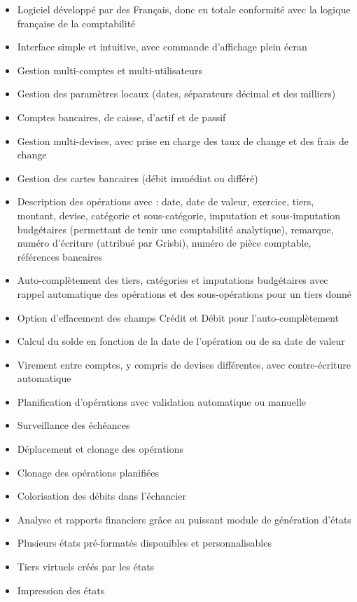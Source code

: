 \begin{itemize}
	\item Logiciel développé par des Français, donc en totale conformité avec la logique française de la comptabilité
	\item Interface simple et intuitive, avec commande d'affichage plein écran
	\item Gestion multi-comptes et multi-utilisateurs
	\item Gestion des paramètres locaux (dates, séparateurs décimal et des milliers)	
	\item Comptes bancaires, de caisse, d'actif et de passif
	\item Gestion multi-devises, avec prise en charge des taux de change et des frais de change
	\item Gestion des cartes bancaires (débit immédiat ou différé)	
	\item Description des opérations avec : date, date de valeur, exercice, tiers,
	montant, devise, catégorie et sous-catégorie, imputation et sous-imputation
	budgétaires (permettant de tenir une comptabilité analytique), remarque, numéro d'écriture (attribué par Grisbi), numéro de pièce
	comptable, références bancaires
	\item Auto-complètement des tiers, catégories et imputations budgétaires avec rappel automatique des  opérations et des sous-opérations pour un tiers donné
	\item Option d'effacement des champs Crédit et Débit pour l'auto-complètement
	\item Calcul du solde en fonction de la date de l'opération ou de sa date de valeur
	\item Virement entre comptes, y compris de devises différentes, avec contre-écriture automatique
	\item Planification d'opérations avec validation automatique ou manuelle
	\item Surveillance des échéances
	\item Déplacement et clonage des opérations
	\item Clonage des opérations planifiées
	\item Colorisation des débits dans l'échancier
	\item Analyse et rapports financiers grâce au puissant module de génération
	d'états
	\item Plusieurs états pré-formatés disponibles et personnalisables
	\item Tiers virtuels créés par les états
	\item Impression des états

\end{itemize}
